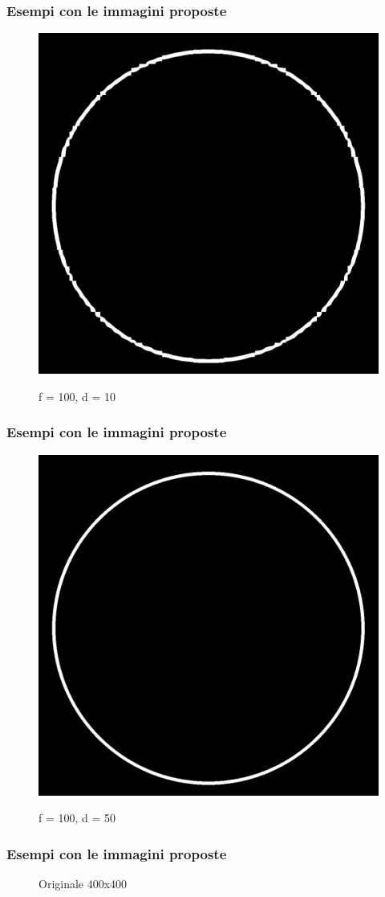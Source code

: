 \documentclass{beamer}
\begin{document}
\begin{frame}
	\frametitle{Esempi con le immagini proposte}
	\begin{figure}
		{\includegraphics[width=.4\linewidth]{../images/circle-compressed-100-10.png}}
		\caption{f = 100, d = 10}
	\end{figure}	
\end{frame}

\begin{frame}
	\frametitle{Esempi con le immagini proposte}
	\begin{figure}
		{\includegraphics[width=.4\linewidth]{../images/circle-compressed-100-50.png}}
		\caption{f = 100, d = 50}
	\end{figure}	
\end{frame}

\begin{frame}
	\frametitle{Esempi con le immagini proposte}
	\begin{figure}
		\caption{Originale 400x400}
	\end{figure}	
\end{frame}
\end{document}
